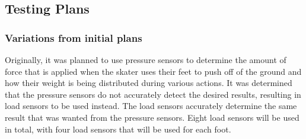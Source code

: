 \subsection{Testing Plans}

\subsubsection{Variations from initial plans}
Originally, it was planned to use pressure sensors to determine the amount of force that is applied when the skater uses their feet to push off of the ground and how their weight is being distributed during various actions. It was determined that the pressure sensors do not accurately detect the desired results, resulting in load sensors to be used instead. The load sensors accurately determine the same result that was wanted from the pressure sensors. Eight load sensors will be used in total, with four load sensors that will be used for each foot.

